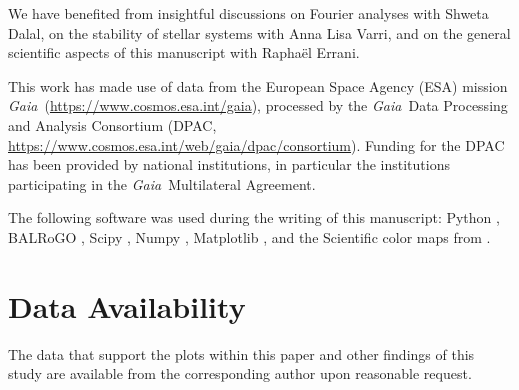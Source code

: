 \documentclass[fleqn,usenatbib]{mnras}
\newcommand{\gaia}{{\sl Gaia}}
\begin{document}
We have benefited from insightful discussions on Fourier analyses with Shweta Dalal, on the stability of stellar systems with Anna Lisa Varri, and on the general scientific aspects of this manuscript with Raphaël Errani.

This work has made use of data from the European Space Agency (ESA) mission \gaia\ (\url{https://www.cosmos.esa.int/gaia}), processed by the \gaia\ Data Processing and Analysis Consortium (DPAC, \url{https://www.cosmos.esa.int/web/gaia/dpac/consortium}). Funding for the DPAC has been provided by national institutions, in particular the institutions participating in the \gaia\ Multilateral Agreement.

The following software was used during the writing of this manuscript: {\sc Python} \citep{VanRossum09}, 
{\sc BALRoGO} \citep{Vitral21},
{\sc Scipy} \citep{Jones+01},
{\sc Numpy} \citep{vanderWalt11},
{\sc Matplotlib} \citep{Hunter07},
and the Scientific color maps from \cite*{Crameri+20}.
\section*{Data Availability}

The data that support the plots within this paper and other findings of this study are available from the corresponding author upon reasonable request.












\end{document}
